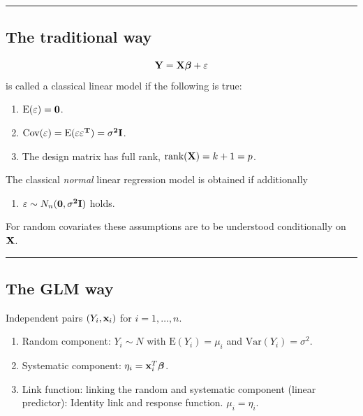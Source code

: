 \documentclass[
]{article}
\providecommand{\tightlist}{%
  \setlength{\itemsep}{0pt}\setlength{\parskip}{0pt}}
\begin{document}
\begin{center}\rule{0.5\linewidth}{0.5pt}\end{center}

\hypertarget{the-traditional-way}{%
\subsection{The traditional way}\label{the-traditional-way}}

\[{\bf Y=X \boldsymbol{\beta}}+{\bf\varepsilon}\] is called a classical
linear model if the following is true:

\begin{enumerate}
\def\labelenumi{\arabic{enumi}.}
\item
  \(\text{E}(\bf{\varepsilon})=\bf{0}\).
\item
  \(\text{Cov}(\bf{\varepsilon})=\text{E}(\bf{\varepsilon}\bf{\varepsilon}^T)=\sigma^2\bf{I}\).
\item
  The design matrix has full rank, \(\text{rank}({\bf X})=k+1=p\).
\end{enumerate}

The classical \emph{normal} linear regression model is obtained if
additionally

\begin{enumerate}
\def\labelenumi{\arabic{enumi}.}
\setcounter{enumi}{3}
\tightlist
\item
  \(\varepsilon\sim N_n(\bf{0},\sigma^2\bf{I})\) holds.
\end{enumerate}

For random covariates these assumptions are to be understood
conditionally on \(\bf{X}\).

\begin{center}\rule{0.5\linewidth}{0.5pt}\end{center}

\hypertarget{the-glm-way}{%
\subsection{The GLM way}\label{the-glm-way}}

Independent pairs \((Y_i, {\bf x}_i)\) for \(i=1,\ldots,n\).

\begin{enumerate}
\def\labelenumi{\arabic{enumi}.}
\tightlist
\item
  Random component: \(Y_i \sim N\) with \(\text{E}(Y_i)=\mu_i\) and
  \(\text{Var}(Y_i)=\sigma^2\).
\item
  Systematic component: \(\eta_i={\bf x}_i^T \boldsymbol{\beta}\).
\item
  Link function: linking the random and systematic component (linear
  predictor): Identity link and response function. \(\mu_i=\eta_i\).
\end{enumerate}
\end{document}
